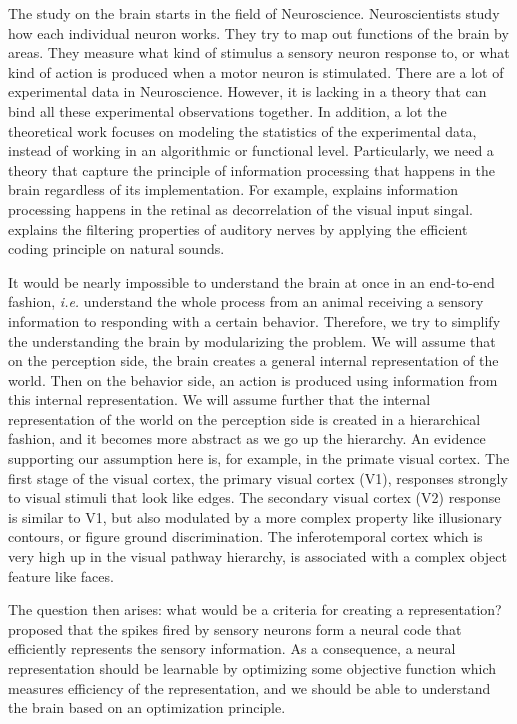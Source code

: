 The study on the brain starts in the field of Neuroscience. Neuroscientists study how each individual neuron works. They try to map out functions of the brain by areas. They measure what kind of stimulus a sensory neuron response to, or what kind of action is produced when a motor neuron is stimulated. There are a lot of experimental data in Neuroscience. However, it is lacking in a theory that can bind all these experimental observations together. In addition, a lot the theoretical work focuses on modeling the statistics of the experimental data, instead of working in an algorithmic or functional level. Particularly, we need a theory that capture the principle of information processing that happens in the brain regardless of its implementation. For example, \textcite{aj92} explains information processing happens in the retinal as decorrelation of the visual input singal. \textcite{sc06} explains the filtering properties of auditory nerves by applying the efficient coding principle on natural sounds.

It would be nearly impossible to understand the brain at once in an end-to-end fashion, \textit{i.e.} understand the whole process from an animal receiving a sensory information to responding with a certain behavior. Therefore, we try to simplify the understanding the brain by modularizing the problem. We will assume that on the perception side, the brain creates a general internal representation of the world. Then on the behavior side, an action is produced using information from this internal representation. We will assume further that the internal representation of the world on the perception side is created in a hierarchical fashion, and it becomes more abstract as we go up the hierarchy. An evidence supporting our assumption here is, for example, in the primate visual cortex. The first stage of the visual cortex, the primary visual cortex (V1), responses strongly to visual stimuli that look like edges. The secondary visual cortex (V2) response is similar to V1, but also modulated by a more complex property like illusionary contours, or figure ground discrimination. The inferotemporal cortex which is very high up in the visual pathway hierarchy, is associated with a complex object feature like faces. 

The question then arises: what would be a criteria for creating a representation? \textcite{bh61} proposed that the spikes fired by sensory neurons form a neural code that efficiently represents the sensory information. As a consequence, a neural representation should be learnable by optimizing some objective function which measures efficiency of the representation, and we should be able to understand the brain based on an optimization principle.


